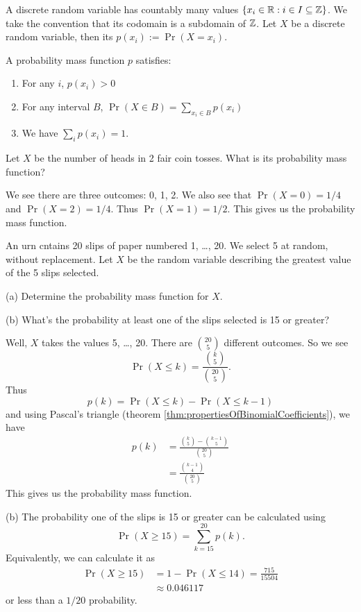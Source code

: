 \M
A discrete random variable has countably many values $\{x_{i}\in\mathbb{R} :
i\in I\subseteq\mathbb{Z}\}$. We take the
convention that its codomain is a subdomain of $\mathbb{Z}$. Let $X$ be a
discrete random variable, then its 
$p(x_{i}):=\Pr(X=x_{i})$.

A probability mass function $p$ satisfies:
\begin{enumerate}
\item For any $i$, $p(x_{i})>0$
\item For any interval $B$, $\Pr(X\in B)=\sum_{x_{i}\in B}p(x_{i})$
\item We have $\sum_{i}p(x_{i})=1$.
\end{enumerate}

Let $X$ be the number of heads in 2 fair coin tosses. What is its
probability mass function?

 We see there are three outcomes: 0, 1, 2. We also see
that $\Pr(X=0)=1/4$ and $\Pr(X=2)=1/4$. Thus $\Pr(X=1)=1/2$. This gives
us the probability mass function.

An urn cntains 20 slips of paper numbered 1, \dots, 20. We select 5 at
random, without replacement. Let $X$ be the random variable describing
the greatest value of the 5 slips selected. 

(a) Determine the probability mass function for $X$.

(b) What's the probability at least one of the slips selected is 15 or
greater?

Well, $X$ takes the values 5, \dots, 20. There are $\binom{20}{5}$
different outcomes. So we see
\begin{equation}
\Pr(X\leq k)=\frac{\binom{k}{5}}{\binom{20}{5}}.
\end{equation}
Thus
\begin{equation}
p(k)=\Pr(X\leq k)-\Pr(X\leq k-1)
\end{equation}
and using Pascal's triangle
(theorem \ref{thm:propertiesOfBinomialCoefficients}), we have
\begin{equation}
\begin{split}
p(k) &=\frac{\binom{k}{5}-\binom{k-1}{5}}{\binom{20}{5}}\\
&=\frac{\binom{k-1}{4}}{\binom{20}{5}}
\end{split}
\end{equation}
This gives us the probability mass function.

(b) The probability one of the slips is 15 or greater can be calculated
using
\begin{equation}
\Pr(X\geq15)=\sum^{20}_{k=15}p(k).
\end{equation}
Equivalently, we can calculate it as
\begin{equation}
\begin{split}
\Pr(X\geq15)&=1-\Pr(X\leq14)=\frac{715}{15504}\\
&\approx 0.046117
\end{split}
\end{equation}
or less than a $1/20$ probability.

